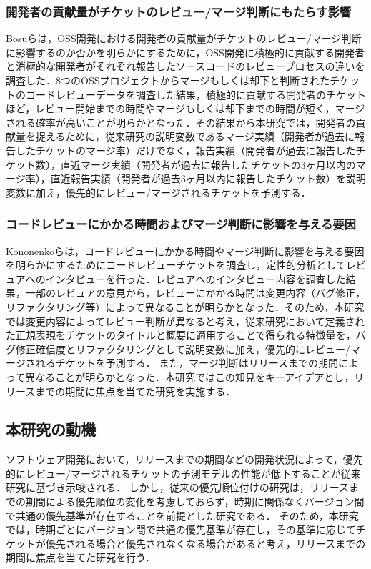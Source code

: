 \documentclass[submit]{ipsj}
\begin{document}
\subsubsection{開発者の貢献量がチケットのレビュー/マージ判断にもたらす影響}
Bosu\cite{review1}らは，OSS開発における開発者の貢献量がチケットのレビュー/マージ判断に影響するのか否かを明らかにするために，OSS開発に積極的に貢献する開発者と消極的な開発者がそれぞれ報告したソースコードのレビュープロセスの違いを調査した．8つのOSSプロジェクトからマージもしくは却下と判断されたチケットのコードレビューデータを調査した結果，積極的に貢献する開発者のチケットほど，レビュー開始までの時間やマージもしくは却下までの時間が短く，マージされる確率が高いことが明らかとなった．その結果から本研究では，開発者の貢献量を捉えるために，従来研究\cite{prioritizer}の説明変数であるマージ実績（開発者が過去に報告したチケットのマージ率）だけでなく，報告実績（開発者が過去に報告したチケット数），直近マージ実績（開発者が過去に報告したチケットの3ヶ月以内のマージ率），直近報告実績（開発者が過去3ヶ月以内に報告したチケット数）を説明変数に加え，優先的にレビュー/マージされるチケットを予測する．

\subsubsection{コードレビューにかかる時間およびマージ判断に影響を与える要因}
Kononenko\cite{release_merge}らは，コードレビューにかかる時間やマージ判断に影響を与える要因を明らかにするためにコードレビューチケットを調査し，定性的分析としてレビュアへのインタビューを行った．レビュアへのインタビュー内容を調査した結果，一部のレビュアの意見から，レビューにかかる時間は変更内容（バグ修正，リファクタリング等）によって異なることが明らかとなった．そのため，本研究では変更内容によってレビュー判断が異なると考え，従来研究\cite{bug}\cite{refactoring}において定義された正規表現をチケットのタイトルと概要に適用することで得られる特徴量を，バグ修正確信度とリファクタリングとして説明変数に加え，優先的にレビュー/マージされるチケットを予測する．
また，マージ判断はリリースまでの期間によって異なることが明らかとなった．本研究ではこの知見をキーアイデアとし，リリースまでの期間に焦点を当てた研究を実施する．

\subsection{本研究の動機}
ソフトウェア開発において，リリースまでの期間などの開発状況によって，優先的にレビュー/マージされるチケットの予測モデルの性能が低下することが従来研究\cite{release_merge}に基づき示唆される．
しかし，従来の優先順位付けの研究\cite{prioritizer}\cite{review_prioritize_pineapple}\cite{prioritize_azeem}\cite{prioritize_fan}は，リリースまでの期間による優先順位の変化を考慮しておらず，時期に関係なくバージョン間で共通の優先基準が存在することを前提とした研究である．
そのため，本研究では，時期ごとにバージョン間で共通の優先基準が存在し，その基準に応じてチケットが優先される場合と優先されなくなる場合があると考え，リリースまでの期間に焦点を当てた研究を行う．
\end{document}
